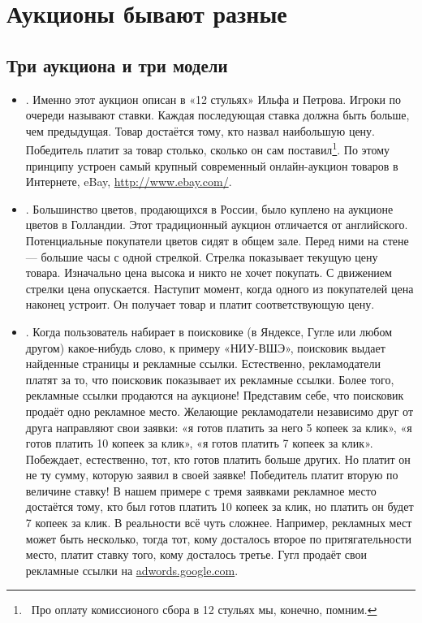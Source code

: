 \chapter{Аукционы бывают разные}




\section{Три аукциона и три модели}

\begin{itemize}

\item {}. Именно этот аукцион описан в «12 стульях» Ильфа и Петрова. Игроки по очереди называют ставки. Каждая последующая ставка должна быть больше, чем предыдущая. Товар достаётся тому, кто назвал наибольшую цену. Победитель платит за товар столько, сколько он сам поставил\footnote{~Про оплату комиссионого сбора в 12 стульях мы, конечно, помним.}. По этому принципу устроен самый крупный современный онлайн-аукцион товаров в Интернете, eBay, \url{http://www.ebay.com/}.

\item {}. Большинство цветов, продающихся в России, было куплено на аукционе цветов в Голландии. Этот традиционный аукцион отличается от английского. Потенциальные покупатели цветов сидят в общем зале. Перед ними на стене — большие часы с одной стрелкой. Стрелка показывает текущую цену товара. Изначально цена высока и никто не хочет покупать. С движением стрелки цена опускается. Наступит момент, когда одного из покупателей цена наконец устроит. Он получает товар и платит соответствующую цену.

\item {}. Когда пользователь набирает в поисковике (в Яндексе, Гугле или любом другом) какое-нибудь слово, к примеру «НИУ-ВШЭ», поисковик выдает найденные страницы и рекламные ссылки. Естественно, рекламодатели платят за то, что поисковик показывает их рекламные ссылки. Более того, рекламные ссылки продаются на аукционе! Представим себе, что поисковик продаёт одно рекламное место. Желающие рекламодатели независимо друг от друга направляют свои заявки: «я готов платить за него 5 копеек за клик», «я готов платить 10 копеек за клик», «я готов платить 7 копеек за клик». Побеждает, естественно, тот, кто готов платить больше других. Но платит он не ту сумму, которую заявил в своей заявке! Победитель платит вторую по величине ставку! В нашем примере с тремя заявками рекламное место достаётся тому, кто был готов платить 10 копеек за клик, но платить он будет 7 копеек за клик. В реальности всё чуть сложнее. Например, рекламных мест может быть несколько, тогда тот, кому досталось второе по притягательности место, платит ставку того, кому досталось третье. Гугл продаёт свои рекламные ссылки на \url{adwords.google.com}.


\end{itemize}
